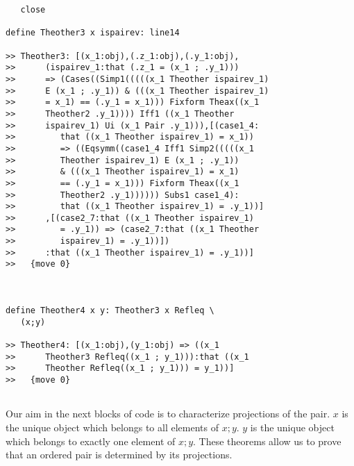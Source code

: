 \documentclass[12pt]{article}
\begin{document}
\begin{verbatim}
   close

define Theother3 x ispairev: line14

>> Theother3: [(x_1:obj),(.z_1:obj),(.y_1:obj),
>>      (ispairev_1:that (.z_1 = (x_1 ; .y_1)))
>>      => (Cases((Simp1(((((x_1 Theother ispairev_1)
>>      E (x_1 ; .y_1)) & (((x_1 Theother ispairev_1)
>>      = x_1) == (.y_1 = x_1))) Fixform Theax((x_1
>>      Theother2 .y_1)))) Iff1 ((x_1 Theother
>>      ispairev_1) Ui (x_1 Pair .y_1))),[(case1_4:
>>         that ((x_1 Theother ispairev_1) = x_1))
>>         => ((Eqsymm((case1_4 Iff1 Simp2(((((x_1
>>         Theother ispairev_1) E (x_1 ; .y_1))
>>         & (((x_1 Theother ispairev_1) = x_1)
>>         == (.y_1 = x_1))) Fixform Theax((x_1
>>         Theother2 .y_1)))))) Subs1 case1_4):
>>         that ((x_1 Theother ispairev_1) = .y_1))]
>>      ,[(case2_7:that ((x_1 Theother ispairev_1)
>>         = .y_1)) => (case2_7:that ((x_1 Theother
>>         ispairev_1) = .y_1))])
>>      :that ((x_1 Theother ispairev_1) = .y_1))]
>>   {move 0}



define Theother4 x y: Theother3 x Refleq \
   (x;y)

>> Theother4: [(x_1:obj),(y_1:obj) => ((x_1
>>      Theother3 Refleq((x_1 ; y_1))):that ((x_1
>>      Theother Refleq((x_1 ; y_1))) = y_1))]
>>   {move 0}


\end{verbatim}

Our aim in the next blocks of code is to characterize projections of the pair.  $x$ is the unique object which belongs to all elements of $x;y$.  $y$ is the unique object which belongs to exactly one element of $x;y$.  These theorems allow us to prove that an ordered pair is determined by its projections.
\end{document}
